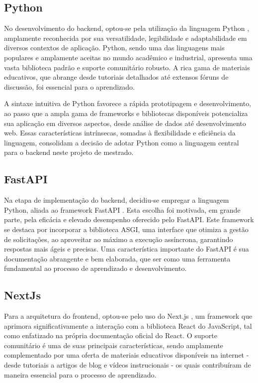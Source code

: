 \subsection{Python}
No desenvolvimento do backend, optou-se pela utilização da linguagem Python \cite{pythonOfficialDocs}, amplamente reconhecida por sua versatilidade, legibilidade e adaptabilidade em diversos contextos de aplicação. Python, sendo uma das linguagens mais populares e amplamente aceitas no mundo acadêmico e industrial, apresenta uma vasta biblioteca padrão e suporte comunitário robusto. A rica gama de materiais educativos, que abrange desde tutoriais detalhados até extensos fóruns de discussão, foi essencial para o aprendizado.

A sintaxe intuitiva de Python favorece a rápida prototipagem e desenvolvimento, ao passo que a ampla gama de frameworks e bibliotecas disponíveis potencializa sua aplicação em diversos aspectos, desde análise de dados até desenvolvimento web. Essas características intrínsecas, somadas à flexibilidade e eficiência da linguagem, consolidam a decisão de adotar Python como a linguagem central para o backend neste projeto de mestrado.


\subsection{FastAPI}
Na etapa de implementação do backend, decidiu-se empregar a linguagem Python, aliada ao framework FastAPI \cite{fastapiDocs}. Esta escolha foi motivada, em grande parte, pela eficácia e elevado desempenho oferecido pelo FastAPI. Este framework se destaca por incorporar a biblioteca \gls{ASGI}, uma interface que otimiza a gestão de solicitações, ao aproveitar ao máximo a execução assíncrona, garantindo respostas mais ágeis e precisas. Uma característica importante do FastAPI é sua documentação abrangente e bem elaborada, que ser como uma ferramenta fundamental ao processo de aprendizado e desenvolvimento.

\subsection{NextJs}
Para a arquitetura do frontend, optou-se pelo uso do Next.js \cite{nextjsDocs}, um framework que aprimora significativamente a interação com a biblioteca React \cite{reactDocs} do JavaScript, tal como enfatizado na própria documentação oficial do React. O suporte comunitário é uma de suas principais características, sendo amplamente complementado por uma oferta de materiais educativos disponíveis na internet - desde tutoriais a artigos de blog e vídeos instrucionais - os quais contribuíram de maneira essencial para o processo de aprendizado.

